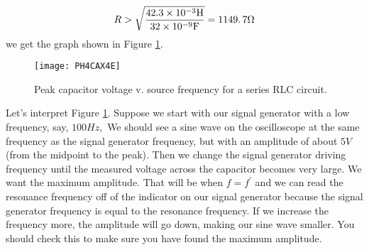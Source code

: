 \begin{equation*}
R>\sqrt{\frac{42.3\times 10^{-3}\unit{H}}{32\times 10^{-9}\unit{F}}}%
=1149.\,\allowbreak 7\unit{%
\Omega%
}
\end{equation*}
we get the graph shown in Figure \ref{fig:rlc_graph}.
\begin{figure}[htbp!]
	\centering
\texttt{[image: PH4CAX4E]}
	\caption{Peak capacitor voltage v. source frequency for a series RLC
	circuit.}
	\label{fig:rlc_graph}
\end{figure}

Let's interpret Figure \ref{fig:rlc_graph}.
Suppose we start with our signal generator with a low frequency, say, $100%
\unit{Hz},$ We should see a sine wave on the oscilloscope at the same
frequency as the signal generator frequency, but with an amplitude of about $%
5\unit{V}$ (from the midpoint to the peak). Then we change the signal
generator driving frequency until the measured voltage across the capacitor
becomes very large. We want the maximum amplitude. That will be when $%
f=f^{\prime }$ and we can read the resonance frequency off of the indicator
on our signal generator because the signal generator frequency is equal to
the resonance frequency. If we increase the frequency more, the amplitude
will go down, making our sine wave smaller. You should check this to make
sure you have found the maximum amplitude.

